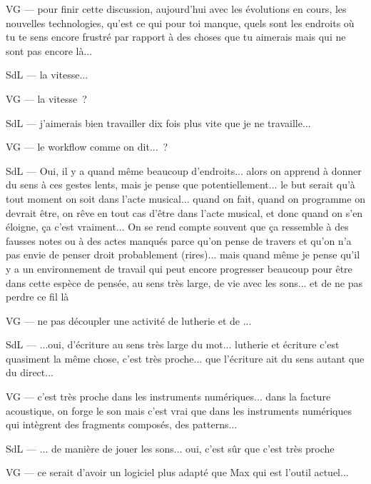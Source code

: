 VG — pour finir cette discussion, aujourd'hui avec les évolutions en cours, les nouvelles technologies, qu'est ce qui pour toi manque, quels sont les endroits où tu te sens encore frustré par rapport à des choses que tu aimerais mais qui ne sont pas encore là... 

SdL — la vitesse... 

VG — la vitesse ? 

SdL — j'aimerais bien travailler dix fois plus vite que je ne travaille... 

VG — le workflow comme on dit... ? 

SdL — Oui, il y a quand même beaucoup d'endroits... alors on apprend à donner du sens à ces gestes lents, mais je pense que potentiellement... le but serait qu'à tout moment on soit dans l'acte musical... quand on fait, quand on programme on devrait être, on rêve en tout cas d'être dans l'acte musical, et donc quand on s'en éloigne, ça c'est vraiment... On se rend compte souvent que ça ressemble à des fausses notes ou à des actes manqués parce qu'on pense de travers et qu'on n'a pas envie de penser droit probablement (rires)... mais quand même je pense qu'il y a un environnement de travail qui peut encore progresser beaucoup pour être dans cette espèce de pensée, au sens très large, de vie avec les sons... et de ne pas perdre ce fil là 

VG — ne pas découpler une activité de lutherie et de ... 

SdL — ...oui, d'écriture au sens très large du mot... lutherie et écriture c'est quasiment la même chose, c'est très proche... que l'écriture ait du sens autant que du direct... 

VG — c'est très proche dans les instruments numériques... dans la facture acoustique, on forge le son mais c'est vrai que dans les instruments numériques qui intègrent des fragments composés, des patterns... 

SdL — ... de manière de jouer les sons... oui, c'est sûr que c'est très proche 

VG — ce serait d'avoir un logiciel plus adapté que Max qui est l'outil actuel... 

